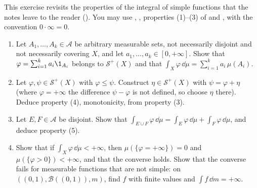 
\begin{exercise}\label{ex:in-simple-rules}
\easy This exercise revisits the properties of the integral of simple functions that the notes
leave to the reader (). You may use
, , properties (1)--(3) of
 and , with the convention
$0\cdot\infty=0$.
\begin{enumerate}[label=(\alph*)]
  \item Let $A_1,\dots,A_k\in\mathcal A$ be arbitrary measurable sets, not necessarily disjoint
    and not necessarily covering $X$, and let $a_1,\dots,a_k\in[0,+\infty]$. Show that
    $\varphi=\sum_{i=1}^ka_i\1_{A_i}$ belongs to $\mathcal S^+(X)$ and that
    $\int_X\varphi\,\dd\mu=\sum_{i=1}^ka_i\,\mu(A_i)$.
  \item Let $\varphi,\psi\in\mathcal S^+(X)$ with $\varphi\le\psi$. Construct $\eta\in\mathcal
    S^+(X)$ with $\psi=\varphi+\eta$ (where $\varphi=+\infty$ the difference $\psi-\varphi$ is not
    defined, so choose $\eta$ there). Deduce property (4), monotonicity, from property (3).
  \item Let $E,F\in\mathcal A$ be disjoint. Show that
    $\int_{E\cup F}\varphi\,\dd\mu=\int_E\varphi\,\dd\mu+\int_F\varphi\,\dd\mu$, and deduce property
    (5).
  \item Show that if $\int_X\varphi\,\dd\mu<+\infty$, then $\mu(\{\varphi=+\infty\})=0$ and
    $\mu(\{\varphi>0\})<+\infty$, and that the converse holds. Show that the converse fails for
    measurable functions that are not simple: on $((0,1),\mathcal B((0,1)),m)$, find $f$ with
    finite values and $\int f\,\dd m=+\infty$.
\end{enumerate}
\end{exercise}

